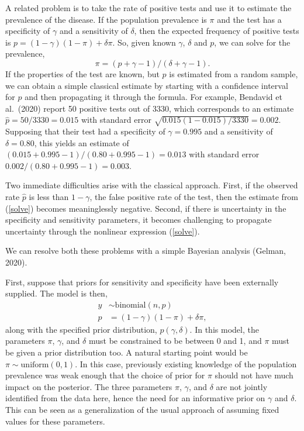 \documentclass[11pt]{article}
\begin{document}
A related problem is to take the rate of positive tests and use it to estimate the prevalence of the disease.  If the population prevalence is $\pi$ and the test has a specificity of $\gamma$ and a sensitivity of $\delta$, then the expected frequency of positive tests is $p=(1-\gamma)(1- \pi)+ \delta\pi$.  So, given known $\gamma$, $\delta$ and $p$, we can solve for the prevalence,
\begin{equation}\label{solve}
  \pi=(p + \gamma - 1)/(\delta + \gamma - 1).
  \end{equation}
If the properties of the test are known, but $p$ is estimated from a random sample, we can obtain a simple classical estimate by starting with a confidence interval for $p$ and then propagating it through the formula.  For example, Bendavid et al.\ (2020) report 50 positive tests out of 3330, which corresponds to an estimate  $\hat{p}=50/3330=0.015$ with standard error $\sqrt{0.015(1-0.015)/3330}=0.002$.  Supposing that their test had a specificity of $\gamma=0.995$ and a sensitivity of $\delta=0.80$, this yields an estimate of $(0.015 + 0.995 - 1)/(0.80 + 0.995 -1) = 0.013$ with standard error $0.002/(0.80 + 0.995 -1) = 0.003$.

Two immediate difficulties arise with the classical approach.  First, if the observed rate $\hat{p}$ is less than  $1-\gamma$, the false positive rate of the test, then the estimate from (\ref{solve}) becomes meaninglessly negative.  Second, if there is uncertainty in the specificity and sensitivity parameters, it becomes challenging to propagate uncertainty through the nonlinear expression (\ref{solve}).

We can resolve both these problems with a simple Bayesian analysis (Gelman, 2020).

First, suppose that priors for sensitivity and specificity have been externally supplied.  The model is then,
\begin{align}
\nonumber  y & \sim \mbox{binomial} (n, p) \\
 p & = (1-\gamma)(1- \pi)+ \delta\pi , \label{normals} 
\end{align}
along with the specified prior distribution, $p(\gamma,\delta)$.  In this model, the parameters $\pi$, $\gamma$, and $\delta$ must be constrained to be between 0 and 1, and $\pi$ must be given a prior distribution too.  A natural starting point would be $\pi\sim \mbox{uniform}(0,1)$.  In this case, previously existing knowledge of the population prevalence was weak enough that the choice of prior for $\pi$ should not have much impact on the posterior.  The three parameters $\pi$, $\gamma$, and $\delta$ are not jointly identified from the data here, hence the need for an informative prior on $\gamma$ and $\delta$. This can be seen as a generalization of the usual approach of assuming fixed values for these parameters. 
\end{document}
